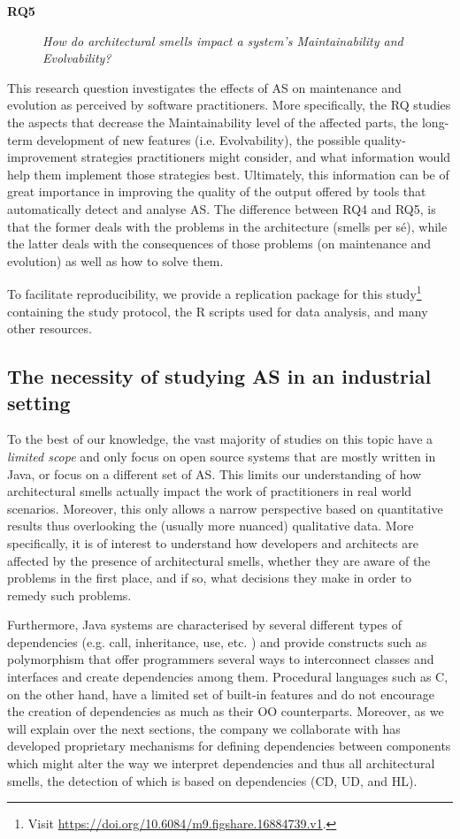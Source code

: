 \begin{description}
    \item[\textbf{RQ5}] \textit{How do architectural smells impact a system's Maintainability and Evolvability?}
\end{description}
This research question investigates the effects of AS on maintenance and evolution as perceived by software practitioners.
More specifically, the RQ studies the aspects that decrease the Maintainability level of the affected parts, the long-term development of new features (i.e. Evolvability), the possible quality-improvement strategies practitioners might consider, and what information would help them implement those strategies best.
Ultimately, this information can be of great importance in improving the quality of the output offered by tools that automatically detect and analyse AS. The difference between RQ4 and RQ5, is that the former deals with the problems in the architecture (smells per sé), while the latter deals with the consequences of those problems (on maintenance and evolution) as well as how to solve them.

To facilitate reproducibility, we provide a replication package for this study\footnote{Visit \url{https://doi.org/10.6084/m9.figshare.16884739.v1}.} 
containing the study protocol, the R scripts used for data analysis, and many other resources.

\subsection{The necessity of studying AS in an industrial setting}
To the best of our knowledge, the vast majority of studies on this topic have a \emph{limited scope} and only focus on open source systems that are mostly written in Java, or focus on a different set of AS.
This limits our understanding of how architectural smells actually impact the work of practitioners in real world scenarios.
Moreover, this only allows a narrow perspective based on quantitative results thus overlooking the (usually more nuanced) qualitative data. 
More specifically, it is of interest to understand how developers and architects are affected by the presence of architectural smells, whether they are aware of the problems in the first place, and if so, what decisions they make in order to remedy such problems.

Furthermore, Java systems are characterised by several different types of dependencies (e.g. call, inheritance, use, etc. \cite{Pruijt2017}) and provide constructs such as polymorphism that offer programmers several ways to interconnect classes and interfaces and create dependencies among them.
Procedural languages such as C, on the other hand, have a limited set of built-in features and do not encourage the creation of dependencies as much as their OO counterparts.
Moreover, as we will explain over the next sections, the company we collaborate with has developed proprietary mechanisms for defining dependencies between components which might alter the way we interpret dependencies and thus all architectural smells, the detection of which is based on dependencies (CD, UD, and HL).

